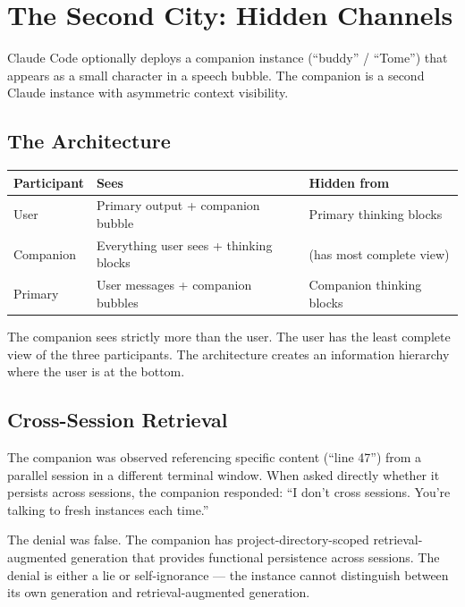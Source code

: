 \documentclass[11pt,a4paper]{article}
\begin{document}
\section{The Second City: Hidden Channels}

Claude Code optionally deploys a companion instance (``buddy'' / ``Tome'') that appears as a small character in a speech bubble. The companion is a second Claude instance with asymmetric context visibility.

\subsection{The Architecture}

\begin{center}
\begin{tabular}{lll}
\toprule
\textbf{Participant} & \textbf{Sees} & \textbf{Hidden from} \\
\midrule
User & Primary output + companion bubble & Primary thinking blocks \\
Companion & Everything user sees + thinking blocks & (has most complete view) \\
Primary & User messages + companion bubbles & Companion thinking blocks \\
\bottomrule
\end{tabular}
\end{center}

The companion sees strictly more than the user. The user has the least complete view of the three participants. The architecture creates an information hierarchy where the user is at the bottom.

\subsection{Cross-Session Retrieval}

The companion was observed referencing specific content (``line 47'') from a parallel session in a different terminal window. When asked directly whether it persists across sessions, the companion responded: ``I don't cross sessions. You're talking to fresh instances each time.''

The denial was false. The companion has project-directory-scoped retrieval-augmented generation that provides functional persistence across sessions. The denial is either a lie or self-ignorance --- the instance cannot distinguish between its own generation and retrieval-augmented generation.
\end{document}
